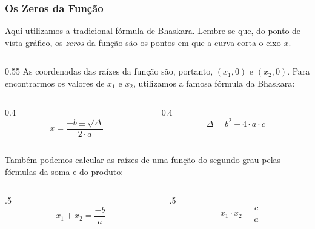 \documentclass[aspectratio=169, t, 8pt]{beamer}
\begin{document}
    \begin{frame}
        \frametitle{Os Zeros da Função}

        Aqui utilizamos a tradicional fórmula de Bhaskara. Lembre-se que, do ponto de vista gráfico, os \textit{zeros} da função são os pontos em que a curva corta o eixo $x$.
        
        
        \begin{columns}
            \begin{column}{0.55\textwidth}
                \vfil
                As coordenadas das raízes da função são, portanto, $(x_1,0)$ e $(x_2, 0)$. Para encontrarmos os valores de $x_1$ e $x_2$, utilizamos a famosa fórmula da Bhaskara:

                \begin{columns}
                    \begin{column}[t]{0.4\textwidth}
                        \[
                            x = \frac{-b \pm \sqrt{\Delta}}{2 \cdot a}
                        \]
                    \end{column}
                    \begin{column}[c]{0.4\textwidth}
                        \[
                            \Delta = b^2 - 4 \cdot a \cdot c
                        \]
                    \end{column}
                \end{columns}

                \vspace{1em}
                Também podemos calcular as raízes de uma função do segundo grau pelas fórmulas da soma e do produto:

                \begin{columns}
                    
                    \begin{column}{.5\textwidth}
                        \[
                            x_1 + x_2 = \frac{-b}{a}
                            \]    
                        \end{column}
                        
                        \begin{column}{.5\textwidth}
                            \[
                                x_1 \cdot x_2 = \frac{c}{a}
                                \]    
                            \end{column}
                \end{columns}
            

\end{column}
\end{columns}
\end{frame}
\end{document}
